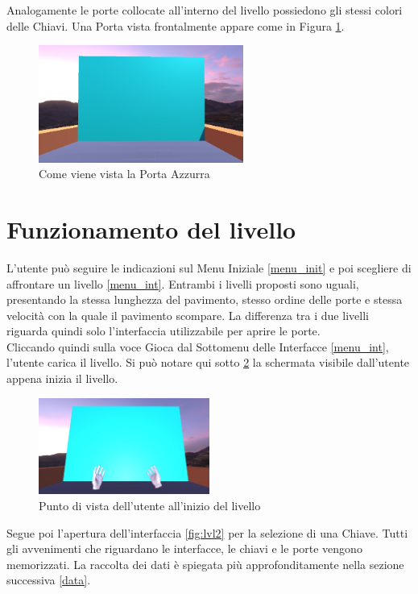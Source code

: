 \documentclass[target=bach,aauheader=]{thud}
\begin{document}
Analogamente le porte collocate all'interno del livello possiedono gli stessi colori delle Chiavi.
Una Porta vista frontalmente appare come in Figura \ref{fig:door}.

\begin{figure}[h]
    \centering
    \includegraphics[width=0.60\textwidth]{door}
    \caption{Come viene vista la Porta Azzurra}
    \label{fig:door}
\end{figure}

\section{Funzionamento del livello}
L'utente può seguire le indicazioni sul Menu Iniziale \ref{menu_init} e poi scegliere di affrontare un livello \ref{menu_int}.
Entrambi i livelli proposti sono uguali, presentando la stessa lunghezza del pavimento, stesso ordine delle porte e stessa velocità con la quale il pavimento scompare.
La differenza tra i due livelli riguarda quindi solo l'interfaccia utilizzabile per aprire le porte. \\

Cliccando quindi sulla voce Gioca dal Sottomenu delle Interfacce \ref{menu_int}, l'utente carica il livello.
Si può notare qui sotto \ref{fig:lvl1} la schermata visibile dall'utente appena inizia il livello.

\begin{figure}[h]
    \centering
    \includegraphics[width=0.50\textwidth]{lvl1}
    \caption{Punto di vista dell'utente all'inizio del livello}
    \label{fig:lvl1}
\end{figure}

\newpage
Segue poi l'apertura dell'interfaccia \ref{fig:lvl2} per la selezione di una Chiave.
Tutti gli avvenimenti che riguardano le interfacce, le chiavi e le porte vengono memorizzati.
La raccolta dei dati è spiegata più approfonditamente nella sezione successiva \ref{data}. \\
\end{document}
